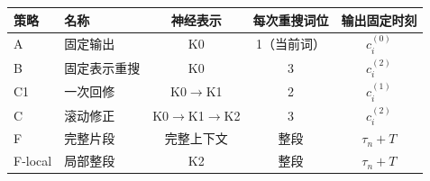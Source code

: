 \begingroup
\papertablestyle
\begin{tabular}{@{}llccc@{}}
\toprule
策略 & 名称 & 神经表示 & 每次重搜词位 & 输出固定时刻 \\
\midrule
A  & 固定输出     & K0                       & 1（当前词） & $c_i^{(0)}$ \\
B  & 固定表示重搜 & K0                       & 3           & $c_i^{(2)}$ \\
C1 & 一次回修     & K0$\to$K1                & 2           & $c_i^{(1)}$ \\
C  & 滚动修正     & K0$\to$K1$\to$K2         & 3           & $c_i^{(2)}$ \\
F  & 完整片段     & 完整上下文               & 整段        & $\tau_n+T$ \\
F-local & 局部整段 & K2                       & 整段        & $\tau_n+T$ \\
\bottomrule
\end{tabular}
\endgroup
